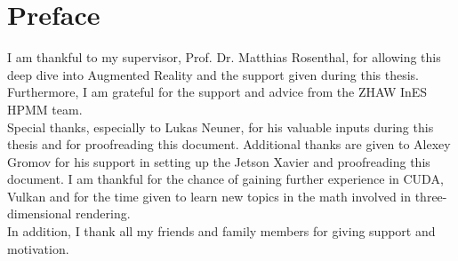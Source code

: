 \chapter*{Preface}
\label{sec:Vorwort}
I am thankful to my supervisor, Prof. Dr. Matthias Rosenthal, for allowing this deep dive into Augmented Reality and the support given during this thesis. Furthermore, I am grateful for the support and advice from the ZHAW InES HPMM team.\\Special thanks, especially to Lukas Neuner, for his valuable inputs during this thesis and for proofreading this document. Additional thanks are given to Alexey Gromov for his support in setting up the Jetson Xavier and proofreading this document. I am thankful for the chance of gaining further experience in CUDA, Vulkan and for the time given to learn new topics in the math involved in three-dimensional rendering. \\
In addition, I thank all my friends and family members for giving support and motivation.